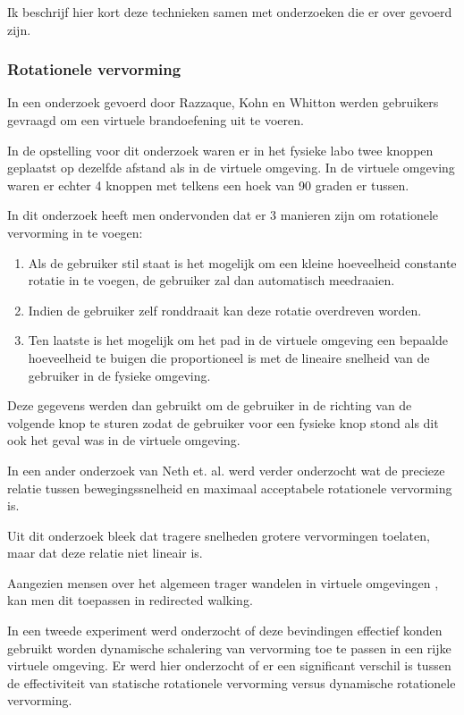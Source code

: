 \documentclass[a4paper,12pt]{article}
\begin{document}
Ik beschrijf hier kort deze technieken samen met onderzoeken die er over gevoerd
zijn.


\subsubsection{Rotationele vervorming}
In een onderzoek gevoerd door Razzaque, Kohn en Whitton\cite{kohn01} werden 
gebruikers gevraagd om een virtuele brandoefening uit te voeren.

In de opstelling voor dit onderzoek waren er in het fysieke labo twee knoppen
geplaatst op dezelfde afstand als in de virtuele omgeving. In de virtuele
omgeving waren er echter 4 knoppen met telkens een hoek van 90 graden er tussen.

In dit onderzoek heeft men ondervonden dat er 3 manieren zijn om rotationele
vervorming in te voegen:

\begin{enumerate}
    \item Als de gebruiker stil staat is het mogelijk om een kleine hoeveelheid
        constante rotatie in te voegen, de gebruiker zal dan automatisch
        meedraaien.
    \item Indien de gebruiker zelf ronddraait kan deze rotatie overdreven worden.
    \item Ten laatste is het mogelijk om het pad in de virtuele omgeving een
        bepaalde hoeveelheid te buigen die proportioneel is met de lineaire
        snelheid van de gebruiker in de fysieke omgeving.
\end{enumerate}

Deze gegevens werden dan gebruikt om de gebruiker in de richting van de volgende
knop te sturen zodat de gebruiker voor een fysieke knop stond als dit ook het
geval was in de virtuele omgeving.

In een ander onderzoek van Neth et. al.\cite{neth12} werd verder onderzocht wat
de precieze relatie tussen bewegingssnelheid en maximaal acceptabele rotationele
vervorming is.

Uit dit onderzoek bleek dat tragere snelheden grotere vervormingen toelaten, maar
dat deze relatie niet lineair is.

Aangezien mensen over het algemeen trager wandelen in virtuele omgevingen
\cite{mohler07}, kan men dit toepassen in redirected walking.

In een tweede experiment\cite{neth12} werd onderzocht of deze bevindingen
effectief konden gebruikt worden dynamische schalering van vervorming toe te
passen in een rijke virtuele omgeving. Er werd hier onderzocht of er een
significant verschil is tussen de effectiviteit van statische rotationele
vervorming versus dynamische rotationele vervorming.
\end{document}
